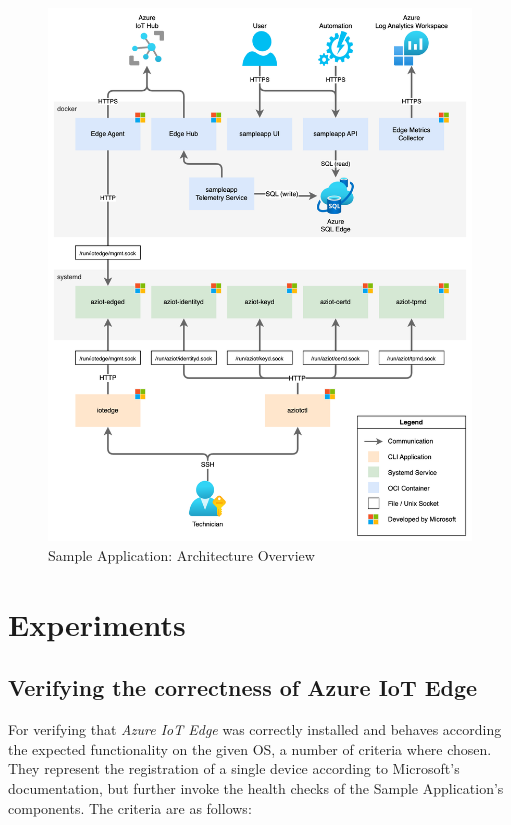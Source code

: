 \begin{figure}[H]
    \includegraphics[width=\textwidth]{fig/sample-app-dataflow.drawio.png}
    \caption{Sample Application: Architecture Overview}
    \label{fig:sample-app-architecture}
\end{figure}

\section{Experiments}
\subsection{Verifying the correctness of Azure IoT Edge}
For verifying that \textit{Azure IoT Edge} was correctly installed
and behaves according the expected functionality on the given
\ac{OS}, a number of criteria where chosen. They represent the registration
of a single device according to Microsoft's documentation, but further
invoke the health checks of the Sample Application's components.
The criteria are as follows:

